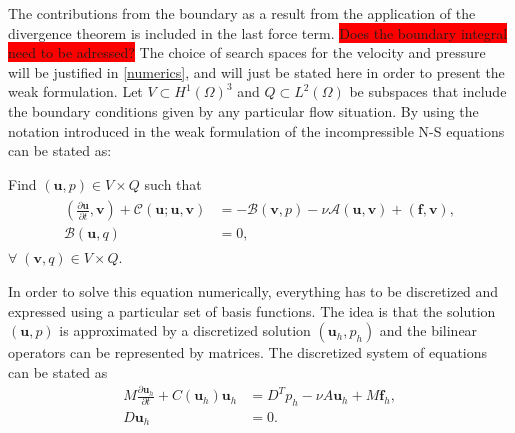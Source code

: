 %
The contributions from the boundary as a result from the application of the divergence theorem is included in the 
last force term. \colorbox{red}{Does the boundary integral need to be adressed?}
The choice of search spaces for the velocity and pressure will be justified in \cref{numerics}, and will 
just be stated here in order to present the weak formulation. Let $V \subset H^1(\Omega)^3$ and $Q \subset L^2(\Omega)$ 
be subspaces that include the boundary conditions given by any particular flow situation.
By using the notation introduced in  the weak formulation of the incompressible
N-S equations can be stated as: 

Find $(\mathbf{u}, p) \in V\times Q$ such that 
\begin{align}
    \begin{split}
        (\frac{\partial \mathbf{u}}{\partial t},\mathbf{v})
        + \mathcal{C}(\mathbf{u};\mathbf{u},\mathbf{v})
        &= -\mathcal{B}(\mathbf{v},p) 
        -\nu\mathcal{A}(\mathbf{u},\mathbf{v})
        + (\mathbf{f},\mathbf{v}), \\
        \mathcal{B}(\mathbf{u},q) &= 0,
    \end{split}
	\label{eq:NSweak}
\end{align}
$\forall\; (\mathbf{v}, q) \in V\times Q$.
%

In order to solve this equation numerically, everything has to be discretized and expressed 
using a particular set of basis functions. The idea is that the solution $(\mathbf{u},p)$ is approximated 
by a discretized solution $(\mathbf{u}_h,p_h)$ and the bilinear operators can be represented 
by matrices. The discretized system of equations can be stated as
%
\begin{align}
    M\frac{\partial \mathbf{u}_h}{\partial t} +C(\mathbf{u}_h)\mathbf{u}_h 
    &= D^Tp_h-\nu A\mathbf{u}_h +M\mathbf{f}_h,\\
    D\mathbf{u}_h &= 0.
    \label{eq:NSMatrixform}
\end{align}
%


